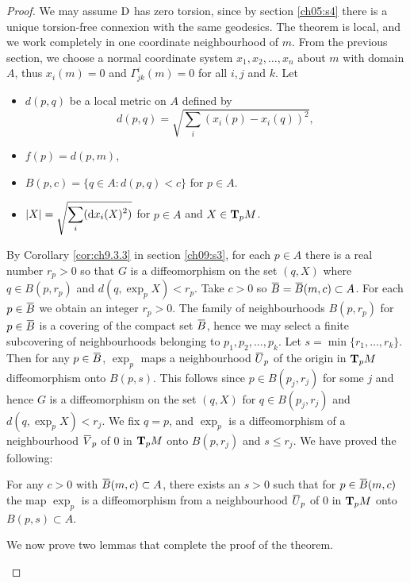 \documentclass[../main]{subfiles}
\begin{document}
\begin{proof}
We may assume $\connection$ has zero torsion, since by section \ref{ch05:s4} there is a unique torsion-free connexion with the same geodesics. The theorem is local, and we work completely in one coordinate neighbourhood of $m$. From the previous section, we choose a normal coordinate system $x_1, x_2, \dots, x_n$ about $m$ with domain $A$, thus $x_i(m) = 0$ and $\Gamma^i_{jk}(m) = 0$ for all $i, j$ and $k$. Let 
\begin{itemize}
    \item $d(p,q)$ be a local metric on $A$ defined by \[d(p,q) = \sqrt{\sum_{i} (x_i(p) - x_i(q))^2},\]
    \item $f(p) = d(p,m)$,
    \item $B(p,c) = \{q\in A: d(p,q)<c\}$ for $p\in A$.
    \item $\norm{X} = \sqrt{\displaystyle \sum_{i} (\dd{x_i}(X)^2)} $ for $p\in A$ and $X\in \tangentspace{M}{p}$.
\end{itemize}

By Corollary \ref{cor:ch9.3.3} in section \ref{ch09:s3}, for each $p\in A$ there is a real number $r_p>0$ so that $G$ is a diffeomorphism on the set $(q,X)$ where $q\in B(p,r_p)$ and $d(q, \exp_p{X}) < r_p$. Take $c>0$ so $\xoverline{B} = \xoverline{B}(m,c)\subset A$. For each $p\in\xoverline{B}$ we obtain an integer $r_p>0$. The family of neighbourhoods $B(p, r_p)$ for $p\in\xoverline{B}$ is a covering of the compact set $\xoverline{B}$, hence we may select a finite subcovering of neighbourhoods belonging to $p_1, p_2, \dots, p_k$. Let $s = \min\{r_1, \dots, r_k\}$. Then for any $p\in\xoverline{B}$, $\exp_p$ maps a neighbourhood $\xoverline{U}_p$ of the origin in $\tangentspace{M}{p}$ diffeomorphism onto $B(p,s)$. This follows since $p\in B(p_j, r_j)$ for some $j$ and hence $G$ is a diffeomorphism on the set $(q, X)$ for $q\in B(p_j,r_j)$ and $d(q, \exp_p{X})<r_j$. We fix $q=p$, and $\exp_p$ is a diffeomorphism of a neighbourhood $\xoverline{V}_p$ of 0 in $\tangentspace{M}{p}$ onto $B(p,r_j)$ and $s\le r_j$. We have proved the following:


\begin{lemma}\label{lem:ch9.4.1a}
For any $c>0$ with $\xoverline{B}(m,c)\subset A$, there exists an $s>0$ such that for $p\in \xoverline{B}(m,c)$ the map $\exp_p$ is a diffeomorphism from a neighbourhood $\xoverline{U}_p$ of 0 in $\tangentspace{M}{p}$ onto $B(p,s)\subset A$.

We now prove two lemmas that complete the proof of the theorem. 
\end{lemma}



\end{proof}
\end{document}
